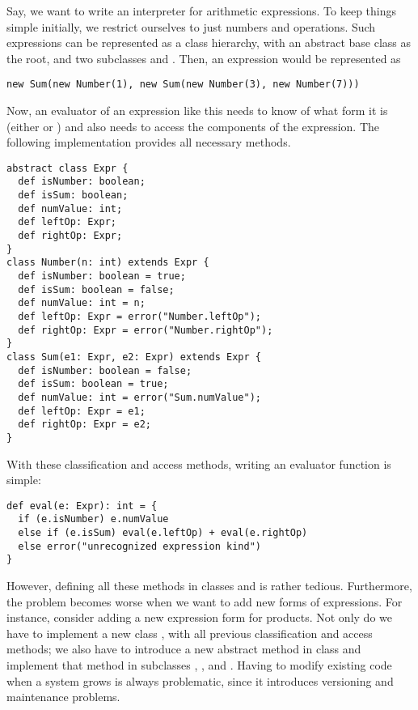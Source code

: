 \documentclass[a4paper,12pt,twoside,titlepage]{book}
\begin{document}
Say, we want to write an interpreter for arithmetic expressions.  To
keep things simple initially, we restrict ourselves to just numbers
and \code{+} operations. Such expressions can be represented as a class hierarchy, with an abstract base class  as the root, and two subclasses  and
. Then, an expression  would be represented as
\begin{lstlisting}
new Sum(new Number(1), new Sum(new Number(3), new Number(7)))
\end{lstlisting}
Now, an evaluator of an expression like this needs to know of what
form it is (either  or ) and also needs to
access the components of the expression.  The following
implementation provides all necessary methods.
\begin{lstlisting}
abstract class Expr {
  def isNumber: boolean;
  def isSum: boolean;
  def numValue: int;
  def leftOp: Expr;
  def rightOp: Expr;
}
class Number(n: int) extends Expr {
  def isNumber: boolean = true;
  def isSum: boolean = false;
  def numValue: int = n;
  def leftOp: Expr = error("Number.leftOp");
  def rightOp: Expr = error("Number.rightOp");
}
class Sum(e1: Expr, e2: Expr) extends Expr {
  def isNumber: boolean = false;
  def isSum: boolean = true;
  def numValue: int = error("Sum.numValue");
  def leftOp: Expr = e1;
  def rightOp: Expr = e2;
}
\end{lstlisting}
With these classification and access methods, writing an evaluator function is simple:
\begin{lstlisting}
def eval(e: Expr): int = {
  if (e.isNumber) e.numValue
  else if (e.isSum) eval(e.leftOp) + eval(e.rightOp)
  else error("unrecognized expression kind")
}
\end{lstlisting}
However, defining all these methods in classes  and
 is rather tedious. Furthermore, the problem becomes worse 
when we want to add new forms of expressions. For instance, consider
adding a new expression form
 for products. Not only do we have to implement a new class , with all previous classification and access methods; we also have to introduce a
new abstract method  in class  and
implement that method in subclasses , , and
. Having to modify existing code when a system grows is always problematic, since it introduces versioning and maintenance problems. 
\end{document}
